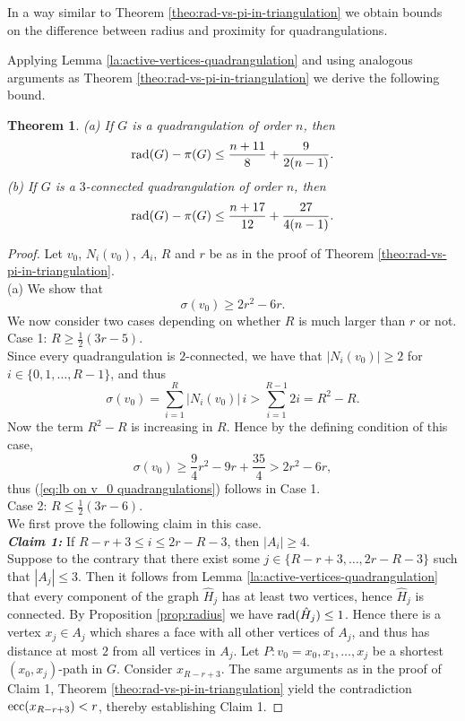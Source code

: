 \documentclass[a4paper,11pt]{article}
\newtheorem{theorem}{Theorem}[section]
\begin{document}
In a way similar to Theorem \ref{theo:rad-vs-pi-in-triangulation} we obtain bounds on the 
difference between radius and proximity for quadrangulations. 

Applying Lemma \ref{la:active-vertices-quadrangulation} and using analogous arguments as 
Theorem \ref{theo:rad-vs-pi-in-triangulation} we derive the following bound.


  \begin{theorem}\label{theo: rad vs in quadrangulation}
(a) If $G$ is a quadrangulation of order $n$, then
  \[
{\rm rad}(G) - \pi(G) \leq \frac{n+11}{8}+\frac{9}{2(n-1)}.
\]
(b) If $G$ is a $3$-connected quadrangulation of order $n$, then 
\[{\rm rad}(G)-\pi(G) \leq \frac{n+17}{12} + \frac{27}{4(n-1)}.\]
  \end{theorem}
  
  \begin{proof}
Let $v_0$, $N_i(v_0)$, $A_i$, $R$ and $r$ 
be as in the proof of Theorem \ref{theo:rad-vs-pi-in-triangulation}. \\[1mm]
(a) We show that 
\begin{equation} \label{eq:lb on v_0 quadrangulations}
\sigma(v_0) \geq  2r^2 - 6r.
\end{equation} 
We now consider two cases depending on whether $R$ is much larger than $r$ or not. \\[1mm]
{\sc Case 1:} $R \geq \frac{1}{2}(3r-5)$. \\
Since every quadrangulation is $2$-connected, we have that $|N_i(v_0)| \geq 2$ for 
$i \in \{0,1,\ldots,R-1\}$, and thus 
\[ \sigma(v_0) = \sum_{i=1}^R |N_i(v_0)| \, i 
       > \sum_{i=1}^{R-1}2i= R^2-R. \] 
Now the term $R^2-R$ is increasing in $R$. Hence by the defining condition of this case, 
\[ \sigma(v_0) \geq  \frac{9}{4}r^2-9r+\frac{35}{4} > 2r^2 - 6r, \]
thus (\ref{eq:lb on v_0 quadrangulations}) follows in Case 1. \\[1mm]
{\sc Case 2:} $R \leq \frac{1}{2}(3r-6)$. \\
We first prove the following claim in this case.\\[1mm]
\emph{{\bf Claim 1:}} If $R-r+3 \leq i \leq 2r-R-3$, then $|A_i| \geq 4$. \\
Suppose to the contrary that there exist some $j \in \{R-r+3,\ldots,2r-R-3\}$ such that $|A_j| \leq 3$. 
Then it follows from Lemma \ref{la:active-vertices-quadrangulation} that every component of the graph 
$\hat{H}_j$ has at least two vertices, hence $\hat{H}_j$ is connected. 
By Proposition \ref{prop:radius} we have ${\rm rad}(\hat{H}_j) \leq 1$.
Hence there is a vertex $x_j \in A_j$ which shares a face with all other vertices of $A_j$, 
and thus has distance at most $2$ from all vertices in $A_j$. Let 
$P: v_0=x_0, x_1,\ldots,x_j$ be a shortest $(x_0, x_j)$-path in $G$. Consider $x_{R-r+3}$. 
The same arguments as in the proof of Claim 1, Theorem \ref{theo:rad-vs-pi-in-triangulation}  
yield the contradiction ${\rm ecc}(x_{R - r + 3}) < r$, thereby establishing Claim 1.  


\end{proof}
\end{document}
